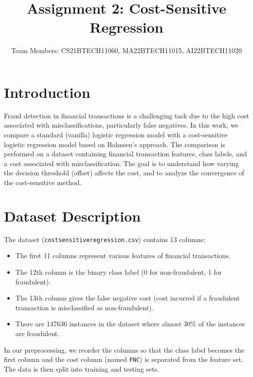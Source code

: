 \documentclass[11pt]{article}
\begin{document}
\title{Assignment 2: Cost-Sensitive Regression}
\author{Team Members: CS21BTECH11060, MA22BTECH11015, AI22BTECH11020}
\maketitle

\section{Introduction}
Fraud detection in financial transactions is a challenging task due to the high cost associated with misclassifications, particularly false negatives. In this work, we compare a standard (vanilla) logistic regression model with a cost-sensitive logistic regression model based on Bahnsen's approach. The comparison is performed on a dataset containing financial transaction features, class labels, and a cost associated with misclassification. The goal is to understand how varying the decision threshold (offset) affects the cost, and to analyze the convergence of the cost-sensitive method.

\section{Dataset Description}
The dataset (\texttt{costsensitiveregression.csv}) contains 13 columns:
\begin{itemize}
    \item The first 11 columns represent various features of financial transactions.
    \item The 12th column is the binary class label (0 for non-fraudulent, 1 for fraudulent).
    \item The 13th column gives the false negative cost (cost incurred if a fraudulent transaction is misclassified as non-fraudulent).
    \item There are 147636 instances in the dataset where almost 30\% of the instances are fraudulent.
\end{itemize}
In our preprocessing, we reorder the columns so that the class label becomes the first column and the cost column (named \texttt{FNC}) is separated from the feature set. The data is then split into training and testing sets.
\end{document}

